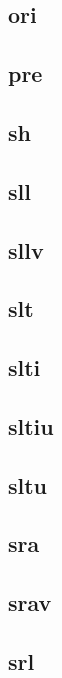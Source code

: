 \documentclass{article}
\begin{document}
\subsection*{ori}

\subsection*{pre}

\subsection*{sh}

\subsection*{sll}

\subsection*{sllv}

\subsection*{slt}

\subsection*{slti}

\subsection*{sltiu}

\subsection*{sltu}

\subsection*{sra}

\subsection*{srav}

\subsection*{srl}
\end{document}
